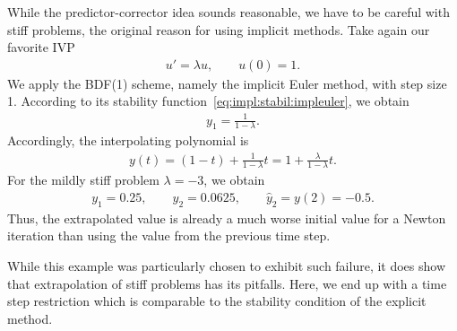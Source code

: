 \begin{example}
  While the predictor-corrector idea sounds reasonable, we have to be
  careful with stiff problems, the original reason for using implicit
  methods. Take again our favorite IVP
  \begin{gather*}
    u' = \lambda u,
    \qquad u(0) = 1.
  \end{gather*}
  We apply the BDF(1) scheme, namely the implicit Euler method, with
  step size 1. According to its stability
  function~\eqref{eq:impl:stabil:impleuler}, we obtain
  \begin{gather*}
    y_1 = \frac1{1-\lambda}.
  \end{gather*}
  Accordingly, the interpolating polynomial is
  \begin{gather*}
    y(t) = (1-t) + \frac1{1-\lambda} t = 1 + \frac{\lambda}{1-\lambda}t.
  \end{gather*}
  For the mildly stiff problem $\lambda = -3$, we obtain
  \begin{gather*}
    y_1 = 0.25, \qquad y_2 = 0.0625,
    \qquad \hat y_2 = y(2) = -0.5.
  \end{gather*}
  Thus, the extrapolated value is already a much worse initial value
  for a Newton iteration than using the value from the previous time
  step.
  
  While this example was particularly chosen to exhibit such failure,
  it does show that extrapolation of stiff problems has its
  pitfalls. Here, we end up with a time step restriction which is
  comparable to the stability condition of the explicit method.
\end{example}


